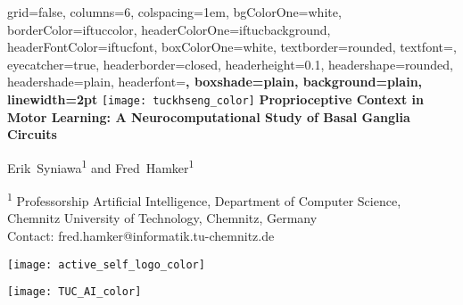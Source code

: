\documentclass[portrait,final,a0paper,fontscale=0.39]{baposter}
\begin{document}
\begin{poster}%
	{
		grid=false,
		columns=6,
		colspacing=1em,
		bgColorOne=white,
		borderColor=iftuccolor,
		headerColorOne=iftucbackground,
		headerFontColor=iftucfont,
		boxColorOne=white,
		textborder=rounded,
		textfont=\small,
		eyecatcher=true,
		headerborder=closed,
		headerheight=0.1\textheight,
		headershape=rounded,
		headershade=plain,
		headerfont=\Large\bf, %
		boxshade=plain,
		background=plain,
		linewidth=2pt
	}
	{\texttt{[image: tuckhseng\_color]}} 
	{\bf\Large{Proprioceptive Context in Motor Learning: A Neurocomputational Study of Basal Ganglia Circuits}\vspace{6pt}}
	{\normalsize Erik~Syniawa\textsuperscript{1} and Fred~Hamker\textsuperscript{1} \\ \vspace{0.8em}
	
	\small\textsuperscript{1} Professorship Artificial Intelligence, Department of Computer Science, \\ Chemnitz University of Technology, Chemnitz, Germany \\ \vspace{0.5em}
	\small Contact: fred.hamker@informatik.tu-chemnitz.de
	}
	{	
		\begin{minipage}[r]{0.1\textwidth}
			\texttt{[image: active\_self\_logo\_color]}
		\end{minipage}
		\hfill
		\begin{minipage}[r]{0.1\textwidth}
			\texttt{[image: TUC\_AI\_color]}
		\end{minipage}
		
	}


\end{poster}
\end{document}
